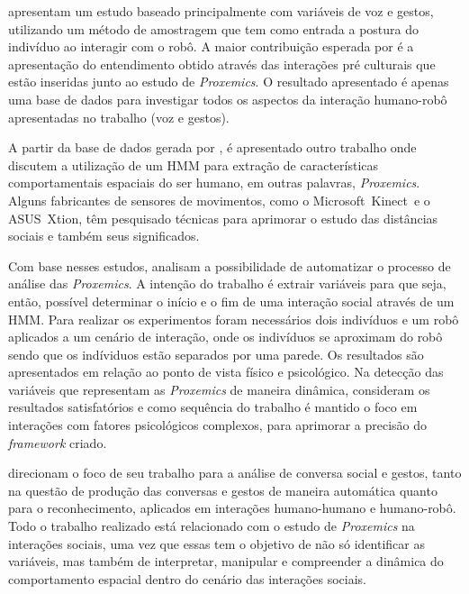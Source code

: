  apresentam um estudo baseado principalmente com variáveis de voz e gestos, utilizando um método de amostragem que tem como entrada a postura do indivíduo ao interagir com o robô. A maior contribuição esperada por  é a apresentação do entendimento obtido através das interações pré culturais que estão inseridas junto ao estudo de \emph{Proxemics}. O resultado apresentado é apenas uma base de dados para investigar todos os aspectos da interação humano-robô apresentadas no trabalho (voz e gestos).

A partir da base de dados gerada por , é apresentado outro trabalho onde  discutem a utilização de um HMM para extração de características comportamentais espaciais do ser humano, em outras palavras, \emph{Proxemics}. Alguns fabricantes de sensores de movimentos, como o Microsoft\textregistered\ Kinect\textregistered\ e o ASUS\textregistered\ Xtion, têm pesquisado técnicas para aprimorar o estudo das distâncias sociais e também seus significados.

Com base nesses estudos,  analisam a possibilidade de automatizar o processo de análise das \emph{Proxemics}. A intenção do trabalho é extrair variáveis para que seja, então, possível determinar o início e o fim de uma interação social através de um HMM. Para realizar os experimentos foram necessários dois indivíduos e um robô aplicados a um cenário de interação, onde os indivíduos se aproximam do robô sendo que os indíviduos estão separados por uma parede. Os resultados são apresentados em relação ao ponto de vista físico e psicológico. Na detecção das variáveis que representam as \emph{Proxemics} de maneira dinâmica,  consideram os resultados satisfatórios e como sequência do trabalho é mantido o foco em interações com fatores psicológicos complexos, para aprimorar a precisão do \emph{framework} criado.

 direcionam o foco de seu trabalho para a análise de conversa social e gestos, tanto na questão de produção das conversas e gestos de maneira automática quanto para o reconhecimento, aplicados em interações humano-humano e humano-robô. Todo o trabalho realizado está relacionado com o estudo de \emph{Proxemics} na interações sociais, uma vez que essas tem o objetivo de não só identificar as variáveis, mas também de interpretar, manipular e compreender a dinâmica do comportamento espacial dentro do cenário das interações sociais.

